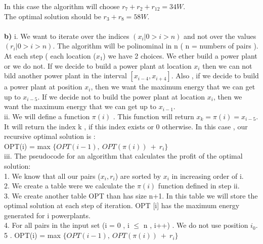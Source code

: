 \documentclass[11 pt]{article}
\begin{document}
 In this case the algorithm will choose $r_7 + r_2+ r_{12} = 34 W$.\\
 The optimal solution should be $r_3+ r_8  = 58 W$.\\ \\ 
 
 
 \textbf{b)} i. We want to iterate over the indices $(x_i |  0 > i > n)$ and not over the values $(r_i | 0 > i > n)$.  The algorithm will be polinominal in  n ( n = numbers of pairs ). At each step ( each location ($x_1$) we have 2 choices. We ether build a power plant or we do not. If we decide to build a power plant at location $x_i$ then we can not bild another power plant in the interval $[x_{i-4}, x_{i+4}]$. Also , if we decide to build a power plant at position $x_i$, then we want the maximum energy that we can get up to $x_{i-5}$. If we decide not to build the power plant at location $x_i$, then we want the maximum energy that we can get up to $x_{i-1}$.\\
 
 ii. We will define a function $\pi (i)$ . This function will return $x_k = \pi (i) = x_{i - 5}$. It will return the index k , if this index exists or 0 otherwise. In this case , our recursive optimal solution is :\\
 OPT(i)  = max $\{OPT(i-1) , \ OPT(\pi (i)) \  + \ r_i  \}$\\
 
 iii. The  pseudocode for an algorithm that calculates the profit of the optimal solution:\\
 1. We know that all our pairs ($x_i, r_i$) are sorted by $x_i$ in increasing order of i.\\
 2. We create a table were we calculate the $\pi (i)$ function defined in step ii.\\
 3. We create another table OPT than has size n+1. In this table we will store the optimal solution at each step of iteration. OPT [i] has the maximum energy generated for i powerplants.\\
 4. For all pairs in the input set (i = 0 , i $\leq$ n , i++) . We do not use position $i_0$.\\
 5 . OPT(i)  = max $\{OPT(i-1) , \ OPT(\pi (i)) \  + \ r_i  \}$\\
 
\end{document}
